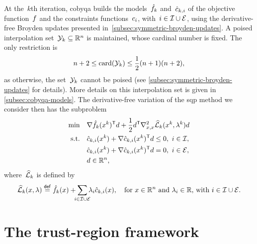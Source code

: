 At the~$k$th iteration, \gls{cobyqa} builds the models~$\objm[k]$ and~$\conm[k]{i}$ of the objective function~$f$ and the constraints functions~$c_{i}$, with~$i \in \mathcal{I} \cup \mathcal{E}$, using the derivative-free Broyden updates presented in~\cref{subsec:symmetric-broyden-updates}.
A poised interpolation set~$\xpt[k] \subseteq \R^n$ is maintained, whose cardinal number is fixed.
The only restriction is
\begin{equation*}
    n + 2 \le \card(\xpt[k]) \le \frac{1}{2} (n + 1) (n + 2),
\end{equation*}
as otherwise, the set~$\xpt[k]$ cannot be poised (see \cref{subsec:symmetric-broyden-updates} for details).
More details on this interpolation set is given in \cref{subsec:cobyqa-models}.
The derivative-free variation of the \gls{sqp} method we consider then has the subproblem
\begin{align*}
    \min        & \quad \nabla \objm[k](\iter[k])^{\T} \step + \frac{1}{2} \step^{\T} \nabla_{x, x}^2 \lagm[k](\iter[k], \lambda^k) \step\\
    \text{s.t.} & \quad \conm[k]{i}(\iter[k]) + \nabla \conm[k]{i}(\iter[k])^{\T} \step \le 0, ~ i \in \iub,\\
                & \quad \conm[k]{i}(\iter[k]) + \nabla \conm[k]{i}(\iter[k])^{\T} \step = 0, ~ i \in \ieq,\\
                & \quad \step \in \R^n,
\end{align*}
where~$\lagm[k]$ is defined by
\begin{equation*}
    \lagm[k](\iter, \lambda) \eqdef \objm[k](\iter) + \sum_{\mathclap{i \in \iub \cup \ieq}} \lambda_i \conm[k]{i}(\iter), \quad \text{for~$\iter \in \R^n$ and~$\lambda_i \in \R$, with~$i \in \iub \cup \ieq$}.
\end{equation*}

\section{The trust-region framework}

